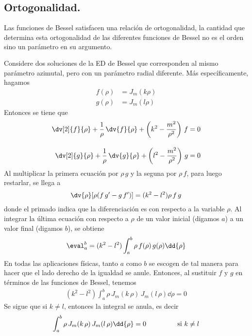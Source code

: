 \subsection{Ortogonalidad.}
Las funciones de Bessel satisfacen una relación de ortogonalidad, la cantidad que determina esta ortogonalidad de las diferentes funciones de Bessel no es el orden sino un parámetro en su argumento.
\par
Considere dos soluciones de la ED de Bessel que corresponden al mismo parámetro azimutal, pero con un parámetro radial diferente. Más específicamente, hagamos
\begin{align*}
f(\rho) &= J_{m} (k \rho) \\
g(\rho) &= J_{m} (l \rho)
\end{align*}
Entonces se tiene que
\begin{align*}
\dv[2]{f}{\rho} + \dfrac{1}{\rho} \, \dv{f}{\rho} + \left( k^{2} - \dfrac{m^{2}}{\rho^{2}} \right) \, f &= 0 \\[1em]
\dv[2]{g}{\rho} + \dfrac{1}{\rho} \, \dv{g}{\rho} + \left( l^{2} - \dfrac{m^{2}}{\rho^{2}} \right) \, g &= 0
\end{align*}
Al multiplicar la primera ecuación por $\rho \, g$ y la seguna por $\rho \, f$, para luego restarlar, se llega a
\begin{align*}
\dv{\rho} [\rho (f \, g^{\prime} - g \, f^{\prime} ) ] = (k^{2} - l^{2}) \rho \, f \, g
\end{align*}
donde el primado indica que la diferenciación es con respecto a la variable $\rho$. Al integrar la última ecuación con respecto a $\rho$ de un valor inicial (digamos $a$) a un valor final (digamos $b$), se obtiene
\begin{align*}
[\rho (f \, g^{\prime} - g \, f^{\prime} ) ]\eval_{a}^{b} = (k^{2} - l^{2}) \int_{a}^{b} \rho \, f(\rho) \, g(\rho) \dd{\rho}
\end{align*}
En todas las aplicaciones físicas, tanto $a$ como $b$ se escogen de tal manera para hacer que el lado derecho de la igualdad se anule. Entonces, al sustituir $f$ y $g$ en términos de las funciones de Bessel, tenemos
\begin{align*}
(k^{2} - l^{2}) \int_{a}^{b} \rho \, J_{m} (k \, \rho) \, J_{m}(l \, \rho) \dd{\rho} = 0
\end{align*}
Se sigue que si $k \neq l$, entonces la integral se anula, es decir
\begin{equation}
\int_{a}^{b} \rho \, J_{m} (k \, \rho) \, J_{m}(l \, \rho) \dd{\rho} = 0 \hspace{1.5cm} \mbox{ si } k \neq l
\label{eq:ecuacion_27_20}
\end{equation}
